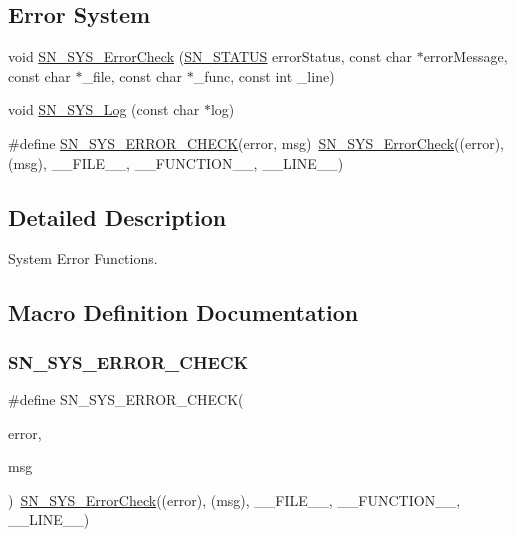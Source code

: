 \subsection*{Error System}
\begin{DoxyCompactItemize}
\item 
void \hyperlink{group__SYSTEM__ERROR_ga0a87cb464a83646bf30c20c867754a02}{S\+N\+\_\+\+S\+Y\+S\+\_\+\+Error\+Check} (\hyperlink{group__SYSTEM__ERROR_ga4540713b9a7a18ce44d78c3a10f7442f}{S\+N\+\_\+\+S\+T\+A\+T\+US} error\+Status, const char $\ast$error\+Message, const char $\ast$\+\_\+file, const char $\ast$\+\_\+func, const int \+\_\+line)
\item 
void \hyperlink{group__SYSTEM__ERROR_gaacf422ec9176edcc5b0d803da0b567b7}{S\+N\+\_\+\+S\+Y\+S\+\_\+\+Log} (const char $\ast$log)
\item 
\#define \hyperlink{group__SYSTEM__ERROR_gaaa32db6b360e68cd1d2a84f7ac1992cd}{S\+N\+\_\+\+S\+Y\+S\+\_\+\+E\+R\+R\+O\+R\+\_\+\+C\+H\+E\+CK}(error,  msg)~\hyperlink{group__SYSTEM__ERROR_ga0a87cb464a83646bf30c20c867754a02}{S\+N\+\_\+\+S\+Y\+S\+\_\+\+Error\+Check}((error), (msg), \+\_\+\+\_\+\+F\+I\+L\+E\+\_\+\+\_\+, \+\_\+\+\_\+\+F\+U\+N\+C\+T\+I\+O\+N\+\_\+\+\_\+, \+\_\+\+\_\+\+L\+I\+N\+E\+\_\+\+\_\+)
\end{DoxyCompactItemize}


\subsection{Detailed Description}
System Error Functions. 



\subsection{Macro Definition Documentation}
\mbox{\label{group__SYSTEM__ERROR_gaaa32db6b360e68cd1d2a84f7ac1992cd}} 
\subsubsection{\texorpdfstring{S\+N\+\_\+\+S\+Y\+S\+\_\+\+E\+R\+R\+O\+R\+\_\+\+C\+H\+E\+CK}{SN\_SYS\_ERROR\_CHECK}}
{\footnotesize\ttfamily \#define S\+N\+\_\+\+S\+Y\+S\+\_\+\+E\+R\+R\+O\+R\+\_\+\+C\+H\+E\+CK(\begin{DoxyParamCaption}\item[{}]{error,  }\item[{}]{msg }\end{DoxyParamCaption})~\hyperlink{group__SYSTEM__ERROR_ga0a87cb464a83646bf30c20c867754a02}{S\+N\+\_\+\+S\+Y\+S\+\_\+\+Error\+Check}((error), (msg), \+\_\+\+\_\+\+F\+I\+L\+E\+\_\+\+\_\+, \+\_\+\+\_\+\+F\+U\+N\+C\+T\+I\+O\+N\+\_\+\+\_\+, \+\_\+\+\_\+\+L\+I\+N\+E\+\_\+\+\_\+)}



